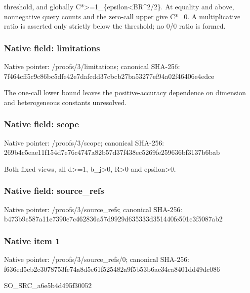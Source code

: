 \documentclass[10pt,a4paper]{article}
\begin{document}
threshold,\allowbreak{} and globally C*>=\allowbreak{}1\_\allowbreak{}\{epsilon<BR\textasciicircum{}2/\allowbreak{}2\}. At equality and above,\allowbreak{} nonnegative query counts and the zero-call upper give C*=\allowbreak{}0. A multiplicative ratio is asserted only strictly below the threshold;\allowbreak{} no 0/\allowbreak{}0 ratio is formed.\par\endgroup

\subsubsection{Native field: limitations}
Native pointer: /proofs/3/limitations; canonical SHA-256: 7f464cff5c9c86bc5dfe42e7dafcdd37cbcb27ba53277ef94a02f46406e4edce

\begingroup\raggedright\sloppy The one-call lower bound leaves the positive-accuracy dependence on dimension and heterogeneous constants unresolved.\par\endgroup

\subsubsection{Native field: scope}
Native pointer: /proofs/3/scope; canonical SHA-256: 269b4c5eae11f154d7e76c4747a82b57d37f438ec5269fe259636bf3137b6bab

\begingroup\raggedright\sloppy Both fixed views,\allowbreak{} all d>=\allowbreak{}1,\allowbreak{} b\_\allowbreak{}j>0,\allowbreak{} R>0 and epsilon>0.\par\endgroup

\subsubsection{Native field: source\_\allowbreak{}refs}
Native pointer: /proofs/3/source\_\allowbreak{}refs; canonical SHA-256: b473b9c587a11c7390e7c462836a57d9929d635333d351440fe501c3f5087ab2

\subsubsection{Native item 1}
Native pointer: /proofs/3/source\_\allowbreak{}refs/0; canonical SHA-256: f636ed5cb2c3078753fe74a8d5e61f525482a9f5b53b6ac34ca8401dd49dc086

\begingroup\raggedright\sloppy SO\_\allowbreak{}SRC\_\allowbreak{}a6e5b4d495f30052\par\endgroup
\end{document}

